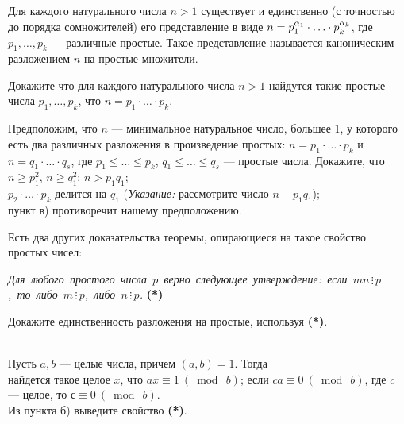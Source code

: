 \documentclass[a4paper,11pt]{article}
\begin{document}




 Для каждого натурального числа $n > 1$ существует и единственно (с точностью до порядка сомножителей) его представление в виде $n=p_1^{\alpha_1}\cdot \ldots \cdot p_k^{\alpha_k}$, где $p_1,\dots,p_k$ --- различные простые. Такое представление называется каноническим разложением $n$ на простые множители.%

  Докажите что для каждого натурального числа $n>1$ найдутся такие простые числа
$p_1,\dots,p_k$, что $n=p_1\cdot \ldots \cdot  p_k$.


Предположим, что $n$ --- минимальное натуральное число, большее 1, 
у которого есть два различных разложения в произведение простых: 
$n = p_1\cdot \ldots \cdot p_k$ и $n = q_1 \cdot \ldots \cdot q_s$, 
где $p_1\le \dots \le p_k$, $q_1\le \dots \le q_s$ --- простые числа. 
Докажите, что
\\
 $n \ge p_1^2$, $n \ge q_1^2$;
 $n > p_1 q_1$;
\\ $p_2\cdot \ldots \cdot p_k$ делится на $q_1$
({\it Указание:} рассмотрите число $n-p_1q_1$);
\\ пункт в) противоречит нашему предположению.

\bigskip
Есть два других доказательства теоремы, опирающиеся на такое свойство простых чисел:

\mbox{\it Для любого простого числа $p$ верно следующее утверждение: если $mn\, \vdots\, p$, то либо $m \,\vdots \, p$, либо $n\, \vdots\, p$.} \hfill \mbox{\textbf{(*)}}
\bigskip

 Докажите единственность разложения на простые, используя \textbf{(*)}.

\\
Пусть $a,b$ --- целые числа, причем $(a,b)=1$. Тогда %
\\
 найдется такое целое $x$, что $ax\equiv 1\ (\bmod\ b)$;
 если $ca\equiv 0\ (\bmod\ b)$, где $c$ --- целое, то $с\equiv 0\ (\bmod\ b)$.
\\
 Из пункта б) выведите свойство \textbf{(*)}.
\end{document}
